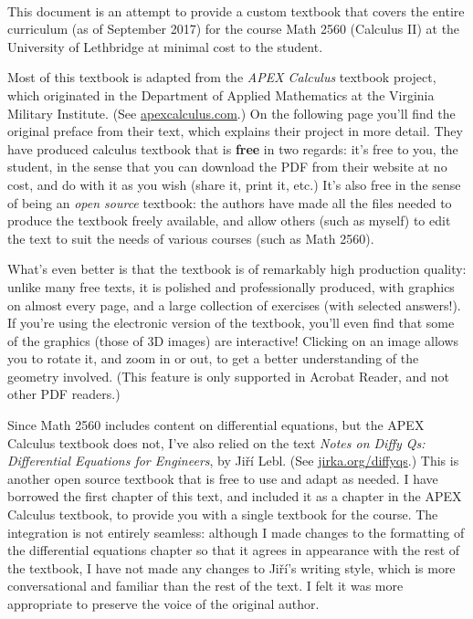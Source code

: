 \thispagestyle{empty}
\Huge
{}\\
\normalsize

This document is an attempt to provide a custom textbook that covers the entire curriculum (as of September 2017) for the course Math 2560 (Calculus II) at the University of Lethbridge at minimal cost to the student.



Most of this textbook is adapted from the \textit{APEX Calculus} textbook project, which originated in the Department of Applied Mathematics at the Virginia Military Institute. (See \href{http://www.apexcalculus.com}{apexcalculus.com}.) On the following page you'll find the original preface from their text, which explains their project in more detail. They have produced calculus textbook that is \textbf{free} in two regards: it's free to you, the student, in the sense that you can download the PDF from their website at no cost, and do with it as you wish (share it, print it, etc.) It's also free in the sense of being an \textit{open source} textbook: the authors have made all the files needed to produce the textbook freely available, and allow others (such as myself) to edit the text to suit the needs of various courses (such as Math 2560).

What's even better is that the textbook is of remarkably high production quality: unlike many free texts, it is polished and professionally produced, with graphics on almost every page, and a large collection of exercises (with selected answers!). If you're using the electronic version of the textbook, you'll even find that some of the graphics (those of 3D images) are interactive! Clicking on an image allows you to rotate it, and zoom in or out, to get a better understanding of the geometry involved. (This feature is only supported in Acrobat Reader, and not other PDF readers.)

Since Math 2560 includes content on differential equations, but the APEX Calculus textbook does not, I've also relied on the text \textit{Notes on Diffy Qs: Differential Equations for Engineers}, by Ji\v{r}\'i Lebl. (See \href{http://www.jirka.org/diffyqs}{jirka.org/diffyqs}.) This is another open source textbook that is free to use and adapt as needed. I have borrowed the first chapter of this text, and included it as a chapter in the APEX Calculus textbook, to provide you with a single textbook for the course. The integration is not entirely seamless: although I made changes to the formatting of the differential equations chapter so that it agrees in appearance with the rest of the textbook, I have not made any changes to Ji\v{r}\'{i}'s writing style, which is more conversational and familiar than the rest of the text. I felt it was more appropriate to preserve the voice of the original author.

